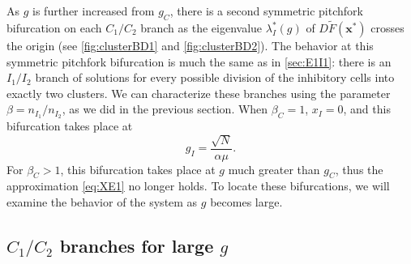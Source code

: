 \documentclass[reqno]{siamonline190516}
\newcommand{\xvec}{\mathbf{x}}
\begin{document}
As $g$ is further increased from $g_C$, there is a second symmetric pitchfork bifurcation on each $C_1/C_2$ branch as the eigenvalue $\lambda_I^*(g)$ of $D\tilde{F}(\xvec^*)$ crosses the origin (see \cref{fig:clusterBD1} and \cref{fig:clusterBD2}). The behavior at this symmetric pitchfork bifurcation is much the same as in \cref{sec:E1I1}: there is an $I_1/I_2$ branch of solutions for every possible division of the inhibitory cells into exactly two clusters. We can characterize these branches using the parameter $\beta = n_{I_1}/n_{I_2}$, as we did in the previous section. When $\beta_C = 1$, $x_I = 0$, and this bifurcation takes place at 
\begin{equation}\label{eq:gpitchinhbeta1}
g_I = \frac{\sqrt{N}}{\alpha \mu}.
\end{equation}
For $\beta_C > 1$, this bifurcation takes place at $g$ much greater than $g_C$, thus the approximation \cref{eq:XE1} no longer holds. To locate these bifurcations, we will examine the behavior of the system as $g$ becomes large.

\subsection{\texorpdfstring{$C_1/C_2$}{C1/C2} branches for large \texorpdfstring{$g$}{g}} 
\end{document}

